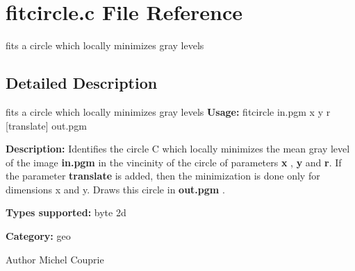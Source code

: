 \section{fitcircle.c File Reference}
\label{fitcircle_8c}


fits a circle which locally minimizes gray levels  




\subsection{Detailed Description}
fits a circle which locally minimizes gray levels {\bfseries Usage:} fitcircle in.pgm x y r [translate] out.pgm

{\bfseries Description:} Identifies the circle C which locally minimizes the mean gray level of the image {\bfseries in.pgm} in the vincinity of the circle of parameters {\bfseries x} , {\bfseries y} and {\bfseries r}. If the parameter {\bfseries translate} is added, then the minimization is done only for dimensions x and y. Draws this circle in {\bfseries out.pgm} .

{\bfseries Types supported:} byte 2d

{\bfseries Category:} geo

\begin{DoxyAuthor}{Author}
Michel Couprie 
\end{DoxyAuthor}
